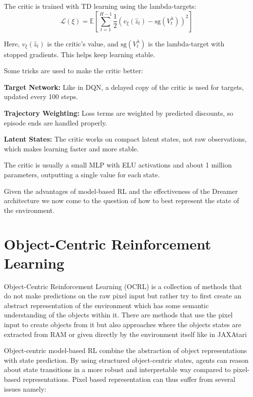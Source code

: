 \documentclass[
	english,
	ruledheaders=section,
	class=report,
	thesis={type=master},
	accentcolor=9c,
	custommargins=true,
	marginpar=false,
	parskip=half-,
	fontsize=11pt,
]{tudapub}
\begin{document}
The critic is trained with TD learning using the lambda-targets:
\begin{equation}
	\mathcal{L}(\xi) = \mathbb{E}\left[\sum_{t=1}^{H-1} \frac{1}{2} \left(v_\xi(\hat{z}_t) - \text{sg}(V^{\lambda}_t)\right)^2\right]
\end{equation}

Here, $v_\xi(\hat{z}_t)$ is the critic's value, and $\text{sg}(V^{\lambda}_t)$
is the lambda-target with stopped gradients. This helps keep learning stable.

Some tricks are used to make the critic better:

\textbf{Target Network:} Like in DQN, a delayed copy of the critic is used for targets, updated every 100 steps.

\textbf{Trajectory Weighting:} Loss terms are weighted by predicted discounts, so episode ends are handled properly.

\textbf{Latent States:} The critic works on compact latent states, not raw observations, which makes learning faster and more stable.

The critic is usually a small MLP with ELU activations and about 1 million
parameters, outputting a single value for each state.

Given the advantages of model-based RL and the effectiveness of the Dreamer
architecture we now come to the question of how to best represent the state of
the environment.

\section{Object-Centric Reinforcement Learning}
\label{sec:object_centric_rl}

Object-Centric Reinforcement Learning (OCRL) is a collection of methods that do
not make predictions on the raw pixel input but rather try to first create an
abstract representation of the environment which has some semantic
understanding of the objects within it. There are methods that use the pixel
input to create objects from it \cite{greff2020object} but also approaches
where the objects states are extracted from RAM \cite{delfosse2023ocatari} or
given directly by the environment itself like in JAXAtari

Object-centric model-based RL combine the abstraction of object representations
with state prediction. By using structured object-centric states, agents can
reason about state transitions in a more robust and interpretable way compared
to pixel-based representations. Pixel based representation can thus suffer from
several issues namely:
\end{document}
